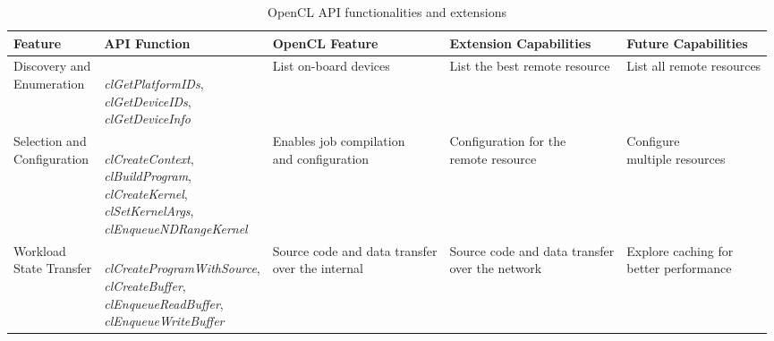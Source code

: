 \begin{landscape}
\begin{table}
	\centering
	\caption{OpenCL API functionalities and extensions}
	
	\begin{tabular}{p{3.0cm}|p{5.5cm}|p{3.5cm}|p{5.0cm}|p{3.7cm}} \hline
    \parbox{3.0cm}{\centering Feature} & \parbox{5.5cm}{\centering API
Function} & \parbox{3.5cm}{\centering OpenCL Feature} &
\parbox{5.0cm}{\centering Extension Capabilities} &
\parbox{3.7cm}{\centering Future Capabilities} \\ \hline

    \parbox{3.0cm}{\centering Discovery and \\Enumeration} & \parbox{5.5cm}{\centering \textit{} \\\textit{clGetPlatformIDs},\\\textit{clGetDeviceIDs},\\\textit{clGetDeviceInfo}
\\\textit{}} & \parbox{3.5cm}{\centering List on-board devices} &
\parbox{5.0cm}{\centering List the best remote resource} &
\parbox{3.7cm}{\centering List all remote resources} \\

    \parbox{3.0cm}{\centering Selection and \\Configuration} &
\parbox{5.5cm}{\centering \textit{}
\\\textit{clCreateContext},\\\textit{clBuildProgram},\\\textit{clCreateKernel},\\\textit{clSetKernelArgs},
\\\textit{clEnqueueNDRangeKernel} \\\textit{}} &
\parbox{3.5cm}{\centering Enables job compilation \\and configuration} &
\parbox{5.0cm}{\centering Configuration for the \\remote resource} &
\parbox{3.7cm}{\centering Configure \\multiple resources} \\

    \parbox{3.0cm}{\centering Workload \\State Transfer} & \parbox{5.5cm}{\centering \textit{}
\\\textit{clCreateProgramWithSource},\\\textit{clCreateBuffer},\\\textit{clEnqueueReadBuffer},\\\textit{clEnqueueWriteBuffer}
\\\textit{}} & \parbox{3.5cm}{\centering Source code and data transfer\\ over the
internal} & \parbox{5.0cm}{\centering Source code and data transfer\\ over
the network} & \parbox{3.7cm}{\centering Explore caching for\\ better performance} \\


\end{tabular}
\end{table}
\end{landscape}

